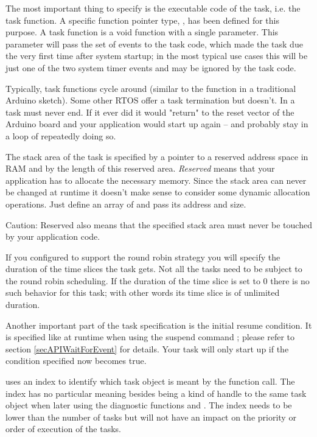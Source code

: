 The most important thing to specify is the executable code of the task,
i.e. the task function. A specific function pointer type,
, has been defined for this purpose. A
task function is a void function with a single parameter. This parameter
will pass the set of events to the task code, which made the task due the
very first time after system startup; in the most typical use cases this
will be just one of the two system timer events and may be ignored by the
task code.

Typically, task functions cycle around (similar to the function
 in a traditional Arduino sketch). Some other RTOS offer a
task termination but \rtos{} doesn't. In \rtos{} a task must never end. If
it ever did it would "return" to the reset vector of the Arduino board and
your application would start up again -- and probably stay in a loop of
repeatedly doing so.

The stack area of the task is specified by a pointer to a reserved address
space in RAM and by the length of this reserved area. \emph{Reserved} means
that your application has to allocate the necessary memory. Since the
stack area can never be changed at runtime it doesn't make sense to
consider some dynamic allocation operations. Just define an array of
 and pass its address and size.

Caution: Reserved also means that the specified stack area must never be
touched by your application code.

If you configured \rtos{} to support the round robin strategy you will
specify the duration of the time slices the task gets. Not all the tasks
need to be subject to the round robin scheduling. If the duration of the
time slice is set to 0 there is no such behavior for this task; with other
words its time slice is of unlimited duration.

Another important part of the task specification is the initial resume
condition. It is specified like at runtime when using the suspend command
; please refer to section
\ref{secAPIWaitForEvent} for details. Your task will only start up if the
condition specified now becomes true.

 uses an index to identify which task object is
meant by the function call. The index has no particular meaning besides
being a kind of handle to the same task object when later using the
diagnostic functions  and
. The index needs to be lower than the number
of tasks but will not have an impact on the priority or order of execution
of the tasks.



